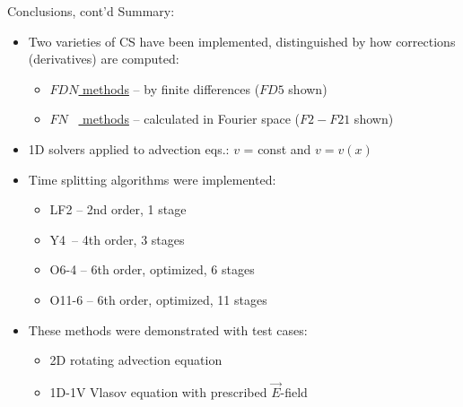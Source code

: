 \documentclass{beamer}
\begin{document}
\begin{frame}{Conclusions, cont'd}
Summary:
    \begin{itemize} 
    \item Two varieties of CS have been implemented, distinguished by how corrections (derivatives) are computed:
        \begin{itemize}
        \item \underline{$FDN$ methods} -- by finite differences ($FD5$ shown)\\[0.5em]
        \item \underline{$FN\phantom{D}$ methods} -- calculated in Fourier space ($F2-F21$ shown)
        \end{itemize}
        \item 1D solvers applied to advection eqs.: $v$ = const and $v = v(x)$
        \item Time splitting algorithms were implemented:
        \begin{itemize} 
        \item LF2\phantom{12} -- 2nd order, 1 stage
        \item Y4\phantom{1-2}\,  -- 4th order, 3 stages
        \item O6-4\phantom{1} -- 6th order, optimized, 6 stages
        \item O11-6 -- 6th order, optimized, 11 stages
        \end{itemize}
    \item These methods were demonstrated with test cases: 
        \begin{itemize} 
        \item 2D rotating advection equation
        \item 1D-1V Vlasov equation with prescribed $\vec{E}$-field
        \end{itemize}
    \end{itemize} 
\end{frame} 

\end{document}
